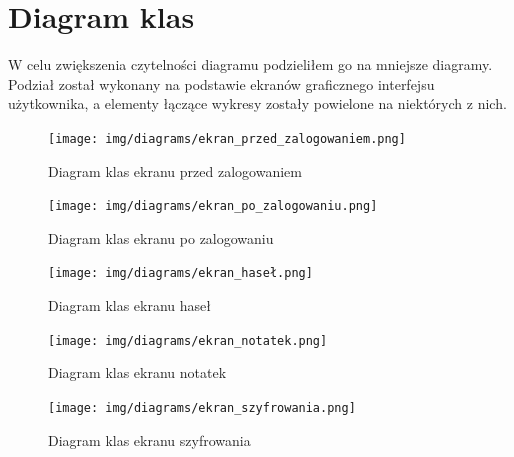 \documentclass[a4paper]{article}
\begin{document}
\section{Diagram klas}
W celu zwiększenia czytelności diagramu podzieliłem go na mniejsze diagramy. Podział został wykonany na podstawie ekranów graficznego interfejsu użytkownika, a elementy łączące wykresy zostały powielone na niektórych z nich.
\begin{figure}[H]
    \centering
    \texttt{[image: img/diagrams/ekran\_przed\_zalogowaniem.png]}
    \caption{Diagram klas ekranu przed zalogowaniem}
    \label{fig:diagramPrzedL}
\end{figure}
\begin{figure}[H]
    \centering
    \texttt{[image: img/diagrams/ekran\_po\_zalogowaniu.png]}
    \caption{Diagram klas ekranu po zalogowaniu}
    \label{fig:diagramPoL}
\end{figure}
\begin{figure}[H]
    \centering
    \texttt{[image: img/diagrams/ekran\_haseł.png]}
    \caption{Diagram klas ekranu haseł}
    \label{fig:diagramH}
\end{figure}
\begin{figure}[H]
    \centering
    \texttt{[image: img/diagrams/ekran\_notatek.png]}
    \caption{Diagram klas ekranu notatek}
    \label{fig:diagramN}
\end{figure}
\begin{figure}[H]
    \centering
    \texttt{[image: img/diagrams/ekran\_szyfrowania.png]}
    \caption{Diagram klas ekranu szyfrowania}
    \label{fig:diagramSz}
\end{figure}
\label{end}
\end{document}
